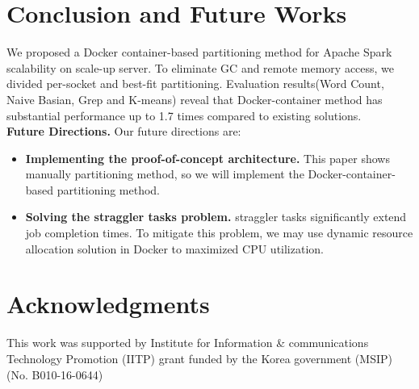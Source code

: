 \section{Conclusion and Future Works}

\ifkor
We proposed a Docker container-based partitioning method for Apache
Spark scalability on scale-up server.
To eliminate GC and remote memory access, we divided per-socket and best-fit partitioning.
Evaluation results(Word Count, Naive Basian, Grep and K-means) reveal
that Docker-container method has substantial performance up to 1.7 times
compared to existing solutions.
\newline\\
\noindent
\textbf{Future Directions.} Our future directions are:
\begin{itemize}
\item \textbf{Implementing the proof-of-concept architecture.} This paper shows manually
partitioning method, so we will implement the Docker-container-based
partitioning method.
\item \textbf{Solving the straggler tasks problem.} straggler tasks
significantly extend job completion times.
To mitigate this problem, we may use dynamic resource allocation solution in
Docker to maximized CPU utilization.
\end{itemize}

\section{Acknowledgments}
This work was supported by Institute for Information \& communications Technology 
Promotion (IITP) grant funded by the Korea government (MSIP) (No. B010-16-0644)

\else

\fi
